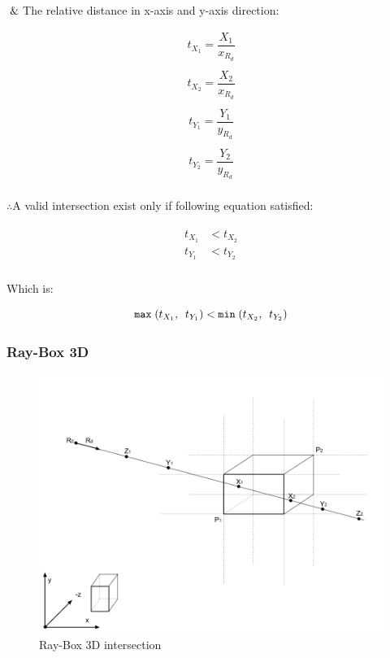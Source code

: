 $\And$\;\;\;\;The relative distance in x-axis and y-axis direction:

\begin{multicols}{2}
\noindent
	\[
	\begin{array}{lr}
	t_{X_1} = \dfrac{X_1}{x_{R_d}}\\\\
	t_{X_2} = \dfrac{X_2}{x_{R_d}}\\
	\end{array}
	\]
\columnbreak
	\[
	\begin{array}{lr}
	t_{Y_1} = \dfrac{Y_1}{y_{R_d}}\\\\
	t_{Y_2} = \dfrac{Y_2}{y_{R_d}}\\
	\end{array}
	\]
\end{multicols}

$\therefore$\;\;\;\;A valid intersection exist only if following equation satisfied:

\[
\begin{array}{lr}
\begin{aligned}
t_{X_1} &< t_{X_2}\\
t_{Y_1} &< t_{Y_2}\\
\end{aligned}
\end{array}
\]

Which is:

\[
\texttt{max}\;(t_{X_1},\enspace t_{Y_1}) < \texttt{min}\;(t_{X_2},\enspace t_{Y_2})
\]

\subsubsection{Ray-Box 3D}

\begin{figure}[H]
\caption{Ray-Box 3D intersection}
\label{fig:ray-box-3d}
\centering
\includegraphics[width=\linewidth]{Figures/ray-box-3d-intersection.png}
\decoRule
\end{figure}

